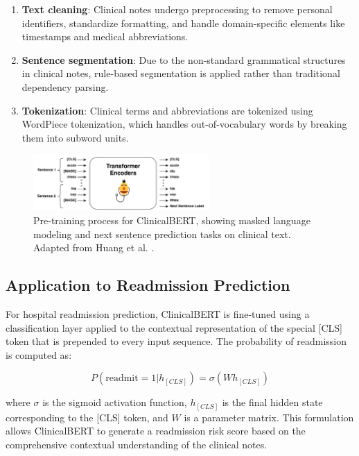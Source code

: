 \documentclass[3p,times,procedia]{elsarticle}
\begin{document}
\begin{enumerate}
    \item \textbf{Text cleaning}: Clinical notes undergo preprocessing to remove personal identifiers, standardize formatting, and handle domain-specific elements like timestamps and medical abbreviations.
    
    \item \textbf{Sentence segmentation}: Due to the non-standard grammatical structures in clinical notes, rule-based segmentation is applied rather than traditional dependency parsing.
    
    \item \textbf{Tokenization}: Clinical terms and abbreviations are tokenized using WordPiece tokenization, which handles out-of-vocabulary words by breaking them into subword units.
\end{enumerate}

\begin{figure}[h]
\centering
\includegraphics[width=0.6\textwidth]{images/clinicalbert_pretraining.png}
\caption{Pre-training process for ClinicalBERT, showing masked language modeling and next sentence prediction tasks on clinical text. Adapted from Huang et al. \cite{Huang2020}.}
\label{fig:clinicalbert_pretraining}
\end{figure}

\subsection{Application to Readmission Prediction}

For hospital readmission prediction, ClinicalBERT is fine-tuned using a classification layer applied to the contextual representation of the special [CLS] token that is prepended to every input sequence. The probability of readmission is computed as:

\begin{equation}
P(\text{readmit} = 1 | h_{[CLS]}) = \sigma(W h_{[CLS]})
\end{equation}

where $\sigma$ is the sigmoid activation function, $h_{[CLS]}$ is the final hidden state corresponding to the [CLS] token, and $W$ is a parameter matrix. This formulation allows ClinicalBERT to generate a readmission risk score based on the comprehensive contextual understanding of the clinical notes.
\end{document}
